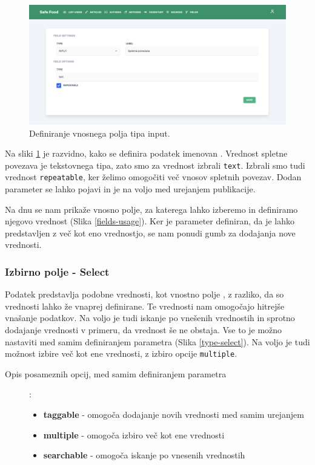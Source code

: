 \documentclass[a4paper, 12pt]{book}
\begin{document}
\begin{figure}[h]
\begin{center}
\includegraphics[width=1\textwidth]{slike/type_input.png}
\end{center}
\caption{ Definiranje vnosnega polja tipa input. }
\label{type-input}
\end{figure}

Na sliki \ref{type-input} je razvidno, kako se definira podatek imenovan . Vrednost spletne povezava je tekstovnega tipa, zato smo za vrednost izbrali \verb=text=. Izbrali smo tudi vrednost \verb=repeatable=, ker želimo omogočiti več vnosov spletnih povezav. Dodan parameter se lahko pojavi in je na voljo med urejanjem publikacije. 

Na dnu se nam prikaže vnosno polje, za katerega lahko izberemo in definiramo njegovo vrednost (Slika \ref{fields-usage}). Ker je parameter definiran, da je lahko predstavljen z več kot eno vrednostjo, se nam ponudi gumb za dodajanja nove vrednosti.

\subsubsection{Izbirno polje - Select}
\label{type-select-page}
Podatek predstavlja podobne vrednosti, kot vnostno polje , z razliko, da so vrednosti lahko že vnaprej definirane. Te vrednosti nam omogočajo hitrejše vnašanje podatkov. Na voljo je tudi iskanje po vnešenih vrednostih in sprotno dodajanje vrednosti v primeru, da vrednost še ne obstaja. Vse to je možno nastaviti med samim definiranjem parametra (Slika \ref{type-select}). Na voljo je tudi možnost izbire več kot ene vrednosti, z izbiro opcije \verb=multiple=.

\begin{description}
\item[Opis posameznih opcij, med samim definiranjem parametra]:
	\begin{itemize}
		\item \textbf{taggable} - omogoča dodajanje novih vrednosti med samim urejanjem
		\item \textbf{multiple} - omogoča izbiro več kot ene vrednosti
		\item \textbf{searchable} - omogoča iskanje po vnesenih vrednostih
	\end{itemize}
\end{description}
\end{document}
